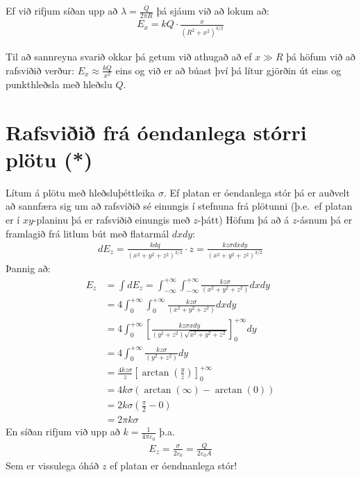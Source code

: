 \ifdefined \wholebook \else\documentclass[oneside]{book}\usepackage{EdlBook}\graphicspath{{figures/}}
\begin{document}
Ef við rifjum síðan upp að $\lambda = \frac{Q}{2\pi R}$ þá sjáum við að lokum að:
\begin{align*}
    E_x = kQ \cdot \frac{x}{(R^2 + x^2)^{3/2}}
\end{align*}

Til að sannreyna svarið okkar þá getum við athugað að ef $x \gg R$ þá höfum við að rafsviðið verður: $E_x \approx \frac{kQ}{x^2}$ eins og við er að búast því þá lítur gjörðin út eins og punkthleðsla með hleðslu $Q$.
  

\section{Rafsviðið frá óendanlega stórri plötu (*)}
Lítum á plötu með hleðsluþéttleika $\sigma$. Ef platan er óendanlega stór þá er auðvelt að sannfæra sig um að rafsviðið sé einungis í stefnuna frá plötunni (þ.e.~ef platan er í $xy$-planinu þá er rafsviðið einungis með $z$-þátt) Höfum þá að á $z$-ásnum þá er framlagið frá litlum bút með flatarmál $dxdy$:
\begin{align*}
    dE_z = \frac{kdq}{(x^2+y^2 + z^2)^{3/2}}\cdot z = \frac{kz\sigma dx dy}{(x^2+y^2+z^2)^{3/2}}
\end{align*}
Þannig að:
\begin{align*}
    E_z &= \int dE_z = \int_{-\infty}^{+\infty} \int_{-\infty}^{+\infty} \frac{kz\sigma}{(x^2+y^2+z^2)}dxdy \\ &= 4\int_{0}^{+\infty} \int_{0}^{+\infty} \frac{kz\sigma}{(x^2+y^2+z^2)}dxdy \\
    &= 4 \int_{0}^{+\infty} \left[ \frac{kz\sigma x dy}{(y^2+z^2)\sqrt{x^2+y^2+z^2}} \right]_{0}^{+\infty} dy \\
    &= 4 \int_{0}^{+\infty} \frac{kz\sigma}{(y^2+z^2)}dy \\
    &= \frac{4kz\sigma}{z} \left[ \arctan(\frac{y}{z}) \right]_{0}^{+\infty} \\
    &= 4k\sigma \left( \arctan(\infty) - \arctan(0) \right) \\
    &= 2k\sigma \left( \frac{\pi}{2} - 0 \right) \\
    &= 2\pi k \sigma
\end{align*}
En síðan rifjum við upp að $k = \frac{1}{4\pi \varepsilon_0}$ þ.a.~
\begin{align*}
    E_z = \frac{\sigma}{2\varepsilon_0} = \frac{Q}{2\varepsilon_0 A}
\end{align*}
Sem er vissulega óháð $z$ ef platan er óendnanlega stór!

\newpage
\end{document}
